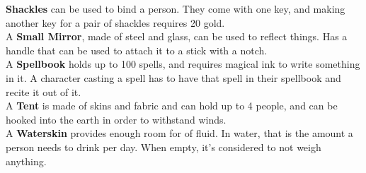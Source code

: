 \textbf{Shackles} can be used to bind a person. They come with one key, and making another key for a pair of shackles requires 20 gold.\\

A \textbf{Small Mirror}, made of steel and glass, can be used to reflect things. Has a handle that can be used to attach it to a stick with a notch.\\

A \textbf{Spellbook} holds up to 100 spells, and requires magical ink to write something in it. A character casting a spell has to have that spell in their spellbook and recite it out of it.\\

A \textbf{Tent} is made of skins and fabric and can hold up to 4 people, and can be hooked into the earth in order to withstand winds.\\

A \textbf{Waterskin} provides enough room for  of fluid. In water, that is the amount a person needs to drink per day. When empty, it's considered to not weigh anything.\\